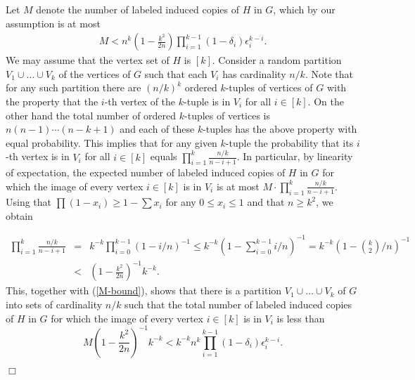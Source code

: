 \documentclass[11pt]{article}
\newenvironment{proof}
      {\medskip\noindent{\bf Proof.}\hspace{1mm}}
      {\hfill$\Box$\medskip}
\begin{document}
\begin{proof}
Let $M$ denote the number of labeled induced copies of $H$ in $G$, which by our assumption is at most
\begin{eqnarray}
\label{M-bound}
M < n^{k}\left(1-\frac{k^2}{2n}\right)\prod_{i=1}^{k-1} (1-\delta_i)\epsilon_i^{k-i}.
\end{eqnarray}
We may assume that the vertex set of $H$ is $[k]$. Consider a random
partition $V_1 \cup \ldots \cup V_k$ of the vertices of $G$ such that each $V_i$ has
cardinality $n/k$. Note that for any such partition there are $(n/k)^k$ ordered
$k$-tuples of vertices of $G$ with the property that the $i$-th vertex of the $k$-tuple is in $V_i$ for all $i
\in [k]$.
On the other hand the total number of ordered $k$-tuples of vertices is $n(n-1)\cdots(n-k+1)$ and each of these
$k$-tuples
has the above property with equal probability. This implies that for any given
$k$-tuple the probability that its $i$-th vertex is in $V_i$ for all $i \in [k]$ equals
$\prod_{i=1}^k \frac{n/k}{n-i+1}$. In particular, by linearity of expectation,
the expected number of labeled induced copies of $H$ in $G$
for which the image of every vertex $i \in [k]$ is in $V_i$ is at most $M\cdot \prod_{i=1}^k \frac{n/k}{n-i+1}$.
Using that $\prod (1-x_i) \geq 1-\sum x_i$ for any $0 \leq x_i \leq 1$ and that $n \geq k^2$, we obtain

\begin{eqnarray*}
\prod_{i=1}^k
\frac{n/k}{n-i+1} &=& k^{-k}\prod_{i=0}^{k-1}(1-i/n)^{-1} \leq
k^{-k}\left(1-\sum_{i=0}^{k-1} i/n\right)^{-1} = k^{-k}\left(1-{k
\choose 2}/n\right)^{-1}\\ &<&
\left(1-\frac{k^2}{2n}\right)^{-1}k^{-k}.
\end{eqnarray*}
This, together with (\ref{M-bound}), shows that there is a partition $V_1 \cup \ldots \cup V_k$ of $G$ into sets
of cardinality $n/k$ such that the total number of labeled induced copies of $H$ in $G$
for which the image of every vertex $i\in [k]$ is in $V_i$ is less than
\begin{equation}
\label{upbound} M\left(1-\frac{k^2}{2n}\right)^{-1}k^{-k}<k^{-k}n^{k}\prod_{i=1}^{k-1}
(1-\delta_i)\epsilon_i^{k-i}.
\end{equation}


\end{proof}
\end{document}
